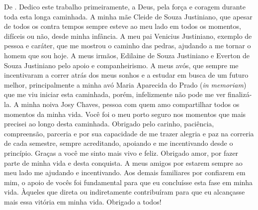 \begin{dedicatoria}
\vspace*{\fill}
De \imprimirAutorDois.
\newline
Dedico este trabalho primeiramente, a Deus, pela força e coragem durante toda esta longa caminhada. A minha mãe Cleide de Souza Justiniano, que apesar de todos os contra tempos sempre esteve ao meu lado em todos os momentos, difíceis ou não, desde minha infância. A meu pai Venicius Justiniano, exemplo de pessoa e caráter, que me mostrou o caminho das pedras, ajudando a me tornar o homem que sou hoje. A meus irmãos, Edilaine de Souza Justiniano e Everton de Souza Justiniano pelo apoio e companheirismo. A meus avós, que sempre me incentivaram a correr atrás dos meus sonhos e a estudar em busca de um futuro melhor, principalmente a minha avó Maria Aparecida do Prado (\textit{in memoriam}) que me viu iniciar esta caminhada, porém, infelizmente não pode me ver finalizá-la. A minha noiva Josy Chaves, pessoa com quem amo compartilhar todos os momentos da minha vida. Você foi o meu porto seguro nos momentos que mais precisei ao longo desta caminhada. Obrigado pelo carinho, paciência, compreensão, parceria e por sua capacidade de me trazer alegria e paz na correria de cada semestre, sempre acreditando, apoiando e me incentivando desde o princípio. Graças a você me sinto mais vivo e feliz. Obrigado amor, por fazer parte de minha vida e desta conquista. A meus amigos por estarem sempre ao meu lado me ajudando e incentivando. Aos demais familiares por confiarem em mim, o apoio de vocês foi fundamental para que eu concluísse esta fase em minha vida. Àqueles que direta ou indiretamente contribuíram para que eu alcançasse mais essa vitória em minha vida. Obrigado a todos!
\end{dedicatoria}
